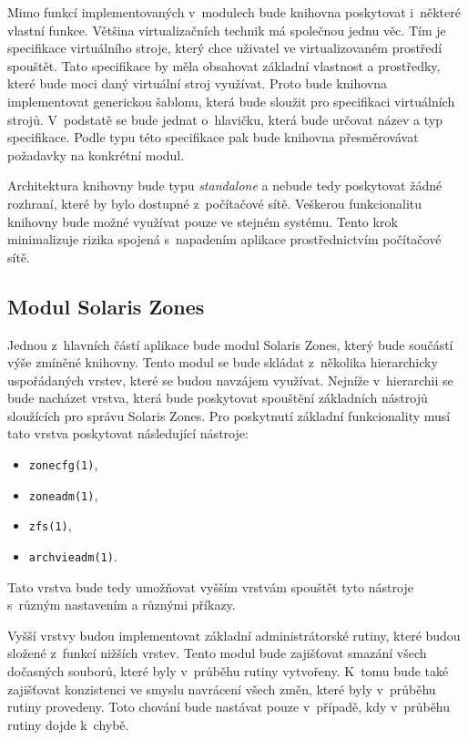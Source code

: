 Mimo funkcí implementovaných v~modulech bude knihovna poskytovat i~některé vlastní funkce. Většina virtualizačních technik
má společnou jednu věc. Tím je specifikace virtuálního stroje, který chce uživatel ve virtualizovaném prostředí spouštět. Tato specifikace
by měla obsahovat základní vlastnost a prostředky, které bude moci daný virtuální stroj využívat. Proto bude knihovna implementovat
generickou šablonu, která bude sloužit pro specifikaci virtuálních strojů. V~podstatě se bude jednat o~hlavičku, která bude určovat
název a typ specifikace. Podle typu této specifikace pak bude knihovna přesměrovávat požadavky na konkrétní modul.

Architektura knihovny bude typu \textit{standalone} a nebude tedy poskytovat žádné rozhraní, které by bylo dostupné z~počítačové
sítě. Veškerou funkcionalitu knihovny bude možné využívat pouze ve stejném systému. Tento krok minimalizuje rizika spojená
s~napadením aplikace prostřednictvím počítačové sítě.
\subsection{Modul Solaris Zones}
\label{chapter:design:architecture:szones}
Jednou z~hlavních částí aplikace bude modul Solaris Zones, který bude součástí výše zmíněné knihovny. Tento modul se bude skládat
z~několika hierarchicky uspořádaných vrstev, které se budou navzájem využívat. Nejníže v~hierarchii se bude nacházet vrstva,
která bude poskytovat spouštění základních nástrojů sloužících pro správu Solaris Zones. Pro poskytnutí základní funkcionality
musí tato vrstva poskytovat následující nástroje:
\begin{itemize}
 \item \verb|zonecfg(1)|,
 \item \verb|zoneadm(1)|,
 \item \verb|zfs(1)|,
 \item \verb|archvieadm(1)|.
\end{itemize}
Tato vrstva bude tedy umožňovat vyšším vrstvám spouštět tyto nástroje s~různým nastavením a různými příkazy.

Vyšší vrstvy budou implementovat základní administrátorské rutiny, které budou složené z~funkcí nižších vrstev. Tento modul
bude zajišťovat smazání všech dočasných souborů, které byly v~průběhu rutiny vytvořeny. K~tomu bude také
zajišťovat konzistenci ve smyslu navrácení všech změn, které byly v~průběhu rutiny provedeny. Toto chování bude nastávat
pouze v~případě, kdy v~průběhu rutiny dojde k~chybě.

